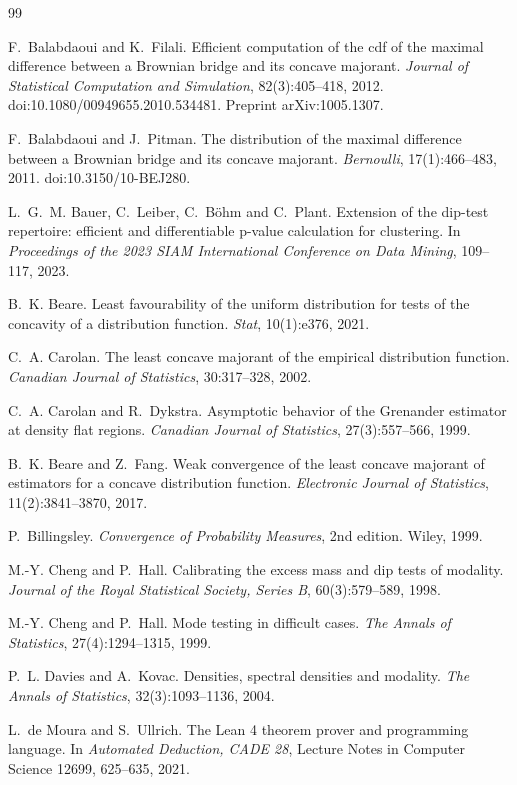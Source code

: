 \begin{thebibliography}{99}\small

 F.~Balabdaoui and K.~Filali. Efficient computation of the cdf of the maximal difference between a Brownian bridge and its concave majorant. \emph{Journal of Statistical Computation and Simulation}, 82(3):405--418, 2012. doi:10.1080/00949655.2010.534481. Preprint arXiv:1005.1307.

 F.~Balabdaoui and J.~Pitman. The distribution of the maximal difference between a Brownian bridge and its concave majorant. \emph{Bernoulli}, 17(1):466--483, 2011. doi:10.3150/10-BEJ280.

 L.~G.~M. Bauer, C.~Leiber, C.~Böhm and C.~Plant. Extension of the dip-test repertoire: efficient and differentiable p-value calculation for clustering. In \emph{Proceedings of the 2023 SIAM International Conference on Data Mining}, 109--117, 2023.

 B.~K. Beare. Least favourability of the uniform distribution for tests of the concavity of a distribution function. \emph{Stat}, 10(1):e376, 2021.

 C.~A. Carolan. The least concave majorant of the empirical distribution function. \emph{Canadian Journal of Statistics}, 30:317--328, 2002.

 C.~A. Carolan and R.~Dykstra. Asymptotic behavior of the Grenander estimator at density flat regions. \emph{Canadian Journal of Statistics}, 27(3):557--566, 1999.

 B.~K. Beare and Z.~Fang. Weak convergence of the least concave majorant of estimators for a concave distribution function. \emph{Electronic Journal of Statistics}, 11(2):3841--3870, 2017.

 P.~Billingsley. \emph{Convergence of Probability Measures}, 2nd edition. Wiley, 1999.

 M.-Y. Cheng and P.~Hall. Calibrating the excess mass and dip tests of modality. \emph{Journal of the Royal Statistical Society, Series B}, 60(3):579--589, 1998.

 M.-Y. Cheng and P.~Hall. Mode testing in difficult cases. \emph{The Annals of Statistics}, 27(4):1294--1315, 1999.

 P.~L. Davies and A.~Kovac. Densities, spectral densities and modality. \emph{The Annals of Statistics}, 32(3):1093--1136, 2004.

 L.~de Moura and S.~Ullrich. The Lean 4 theorem prover and programming language. In \emph{Automated Deduction, CADE 28}, Lecture Notes in Computer Science 12699, 625--635, 2021.


\end{thebibliography}

